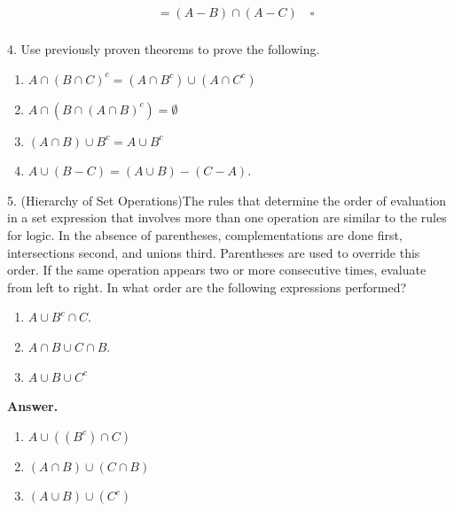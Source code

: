 \documentclass[10pt,]{book}
\theoremstyle{plain}
\theoremstyle{definition}
\theoremstyle{definition}
\theoremstyle{definition}
\begin{document}
\begin{exercisegroup}
\begin{enumerate}[label=\alph*]
\begin{equation*}
\begin{split}
              & =(A-B)\cap (A-C)  \quad \square\\
   \end{split}
	\end{equation*}%
\end{enumerate}
%
\item[4.]\hypertarget{exercise-9}{} Use previously proven theorems to prove the following.%
\par
\leavevmode%
\begin{enumerate}[label=\alph*]
\item\hypertarget{li-42}{}  \(A \cap (B\cap C)^c= (A\cap B^c)\cup (A\cap C^{c })\)%
\item\hypertarget{li-43}{}  \(A \cap (B\cap (A\cap B)^c)= \emptyset\)%
\item\hypertarget{li-44}{}  \((A\cap B) \cup  B^c = A \cup  B^c\)%
\item\hypertarget{li-45}{}  \(A \cup  (B - C) = (A \cup  B) - (C - A)\).%
\end{enumerate}
%
\par\smallskip
\item[5.]\hypertarget{exercise-10}{}(Hierarchy of Set Operations)\space\space{}The rules that determine the order of evaluation in a set expression that involves more than one operation are similar to the rules for logic. In the absence of parentheses, complementations are done first, intersections second, and unions third. Parentheses are used to override this order. If the same operation appears two or more consecutive times, evaluate from left to right. In what order are the
following expressions performed?%
\par
\leavevmode%
\begin{multicols}{2}
\begin{enumerate}[label=\alph*]
\item\hypertarget{li-46}{}\(A \cup  B^c\cap C\). %
\item\hypertarget{li-47}{}\(A\cap B \cup  C\cap B\). %
\item\hypertarget{li-48}{}\(A \cup  B \cup  C^c\) %
\end{enumerate}
\end{multicols}
%
\par\smallskip
\par\smallskip
\noindent\textbf{Answer.}\hypertarget{answer-5}{}\quad
\leavevmode%
\begin{multicols}{3}
\begin{enumerate}[label=\alph*]
\item\hypertarget{li-49}{} \(A\cup ((B^c)\cap C)\) %
\item\hypertarget{li-50}{} \((A\cap B)\cup (C\cap B)\) %
\item\hypertarget{li-51}{} \((A\cup B)\cup (C^c)\)%
\end{enumerate}
\end{multicols}
%
\end{exercisegroup}
\end{document}
